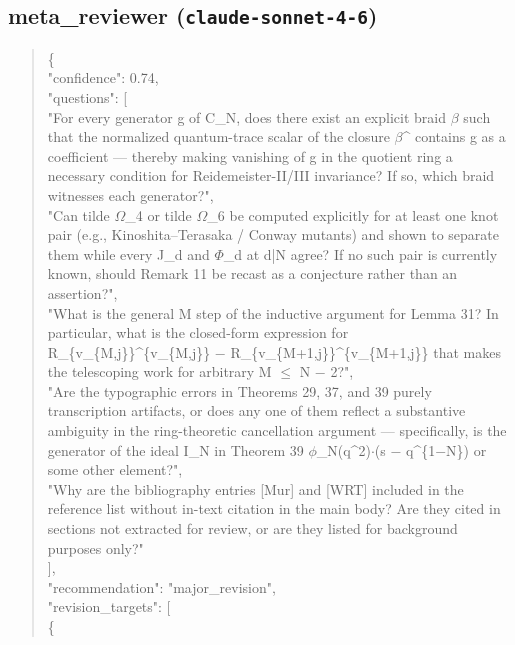 \documentclass[11pt]{article}
\begin{document}
\subsection*{meta\_reviewer (\texttt{claude-sonnet-4-6})}
\begin{quote}\small\ttfamily\raggedright
\{\\
  "confidence": 0.74,\\
  "questions": [\\
    "For every generator g of C\_N, does there exist an explicit braid \ensuremath{\beta} such that the normalized quantum-trace scalar of the closure \ensuremath{\beta}\^{} contains g as a coefficient --- thereby making vanishing of g in the quotient ring a necessary condition for Reidemeister-II/III invariance? If so, which braid witnesses each generator?",\\
    "Can tilde \ensuremath{\Omega}\_4 or tilde \ensuremath{\Omega}\_6 be computed explicitly for at least one knot pair (e.g., Kinoshita--Terasaka / Conway mutants) and shown to separate them while every J\_d and \ensuremath{\Phi}\_d at d|N agree? If no such pair is currently known, should Remark 11 be recast as a conjecture rather than an assertion?",\\
    "What is the general M step of the inductive argument for Lemma 31? In particular, what is the closed-form expression for R\_\{v\_\{M,j\}\}\^{}\{v\_\{M,j\}\} \ensuremath{-} R\_\{v\_\{M+1,j\}\}\^{}\{v\_\{M+1,j\}\} that makes the telescoping work for arbitrary M \ensuremath{\le} N \ensuremath{-} 2?",\\
    "Are the typographic errors in Theorems 29, 37, and 39 purely transcription artifacts, or does any one of them reflect a substantive ambiguity in the ring-theoretic cancellation argument --- specifically, is the generator of the ideal I\_N in Theorem 39 \ensuremath{\phi}\_N(q\^{}2)\ensuremath{\cdot}(s \ensuremath{-} q\^{}\{1\ensuremath{-}N\}) or some other element?",\\
    "Why are the bibliography entries [Mur] and [WRT] included in the reference list without in-text citation in the main body? Are they cited in sections not extracted for review, or are they listed for background purposes only?"\\
  ],\\
  "recommendation": "major\_revision",\\
  "revision\_targets": [\\
    \{\\

\end{quote}
\end{document}
